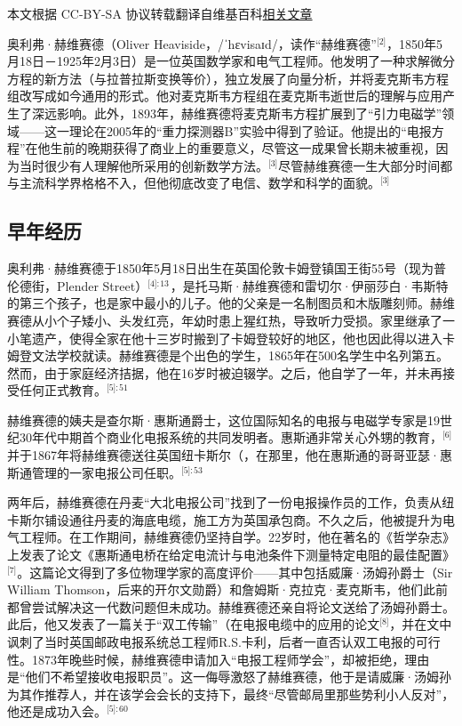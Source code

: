
本文根据 CC-BY-SA 协议转载翻译自维基百科\href{https://en.wikipedia.org/wiki/Oliver_Heaviside}{相关文章}

奥利弗·赫维赛德（Oliver Heaviside，/ˈhɛvisaɪd/，读作“赫维赛德”\(^\text{[2]}\)，1850年5月18日－1925年2月3日）是一位英国数学家和电气工程师。他发明了一种求解微分方程的新方法（与拉普拉斯变换等价），独立发展了向量分析，并将麦克斯韦方程组改写成如今通用的形式。他对麦克斯韦方程组在麦克斯韦逝世后的理解与应用产生了深远影响。此外，1893年，赫维赛德将麦克斯韦方程扩展到了“引力电磁学”领域——这一理论在2005年的“重力探测器B”实验中得到了验证。他提出的“电报方程”在他生前的晚期获得了商业上的重要意义，尽管这一成果曾长期未被重视，因为当时很少有人理解他所采用的创新数学方法。\(^\text{[3]}\)尽管赫维赛德一生大部分时间都与主流科学界格格不入，但他彻底改变了电信、数学和科学的面貌。\(^\text{[3]}\)
\subsection{早年经历}
奥利弗·赫维赛德于1850年5月18日出生在英国伦敦卡姆登镇国王街55号（现为普伦德街，Plender Street）\(^\text{[4]: 13 }\)，是托马斯·赫维赛德和雷切尔·伊丽莎白·韦斯特的第三个孩子，也是家中最小的儿子。他的父亲是一名制图员和木版雕刻师。赫维赛德从小个子矮小、头发红亮，年幼时患上猩红热，导致听力受损。家里继承了一小笔遗产，使得全家在他十三岁时搬到了卡姆登较好的地区，他也因此得以进入卡姆登文法学校就读。赫维赛德是个出色的学生，1865年在500名学生中名列第五。然而，由于家庭经济拮据，他在16岁时被迫辍学。之后，他自学了一年，并未再接受任何正式教育。\(^\text{[5]: 51 }\)

赫维赛德的姨夫是查尔斯·惠斯通爵士，这位国际知名的电报与电磁学专家是19世纪30年代中期首个商业化电报系统的共同发明者。惠斯通非常关心外甥的教育，\(^\text{[6]}\)并于1867年将赫维赛德送往英国纽卡斯尔（，在那里，他在惠斯通的哥哥亚瑟·惠斯通管理的一家电报公司任职。\(^\text{[5]: 53 }\)

两年后，赫维赛德在丹麦“大北电报公司”找到了一份电报操作员的工作，负责从纽卡斯尔铺设通往丹麦的海底电缆，施工方为英国承包商。不久之后，他被提升为电气工程师。在工作期间，赫维赛德仍坚持自学。22岁时，他在著名的《哲学杂志》上发表了论文《惠斯通电桥在给定电流计与电池条件下测量特定电阻的最佳配置》\(^\text{[7]}\)。这篇论文得到了多位物理学家的高度评价——其中包括威廉·汤姆孙爵士（Sir William Thomson，后来的开尔文勋爵）和詹姆斯·克拉克·麦克斯韦，他们此前都曾尝试解决这一代数问题但未成功。赫维赛德还亲自将论文送给了汤姆孙爵士。此后，他又发表了一篇关于“双工传输”（在电报电缆中的应用的论文\(^\text{[8]}\)，并在文中讽刺了当时英国邮政电报系统总工程师R.S.卡利，后者一直否认双工电报的可行性。1873年晚些时候，赫维赛德申请加入“电报工程师学会”，却被拒绝，理由是“他们不希望接收电报职员”。这一侮辱激怒了赫维赛德，他于是请威廉·汤姆孙为其作推荐人，并在该学会会长的支持下，最终“尽管邮局里那些势利小人反对”，他还是成功入会。\(^\text{[5]: 60 }\)

